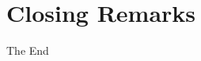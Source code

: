 \documentclass{beamer}
\begin{document}





\section{Closing Remarks}
	\begin{frame}
	\Huge{\centerline{The End}}
	\end{frame}

\end{document}
